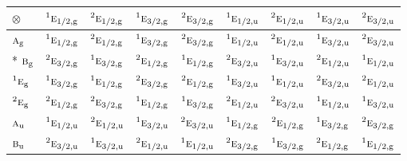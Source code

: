 \documentclass[10pt,a4paper]{article}
\numberwithin{equation}{section}
\newcommand{\irr}[1]{\text{\normalfont\scshape #1}}
\newcommand{\conjpair}[1]{{}^{#1}}
\newcommand{\ptag}[1]{\mathrm{#1}}
\newcommand{\irrprod}{\otimes}
\begin{document}
{\small\setlength{\tabcolsep}{3pt}\begin{longtable}{@{}lcccccccc@{}}\toprule
$\irrprod$ & $\conjpair{1}\irr{e}_{1/2,\ptag{g}}$ & $\conjpair{2}\irr{e}_{1/2,\ptag{g}}$ & $\conjpair{1}\irr{e}_{3/2,\ptag{g}}$ & $\conjpair{2}\irr{e}_{3/2,\ptag{g}}$ & $\conjpair{1}\irr{e}_{1/2,\ptag{u}}$ & $\conjpair{2}\irr{e}_{1/2,\ptag{u}}$ & $\conjpair{1}\irr{e}_{3/2,\ptag{u}}$ & $\conjpair{2}\irr{e}_{3/2,\ptag{u}}$\\\midrule\endhead
\bottomrule\endfoot\endlastfoot
$\irr{a}_{\ptag{g}}$ & $\conjpair{1}\irr{e}_{1/2,\ptag{g}}$ & $\conjpair{2}\irr{e}_{1/2,\ptag{g}}$ & $\conjpair{1}\irr{e}_{3/2,\ptag{g}}$ & $\conjpair{2}\irr{e}_{3/2,\ptag{g}}$ & $\conjpair{1}\irr{e}_{1/2,\ptag{u}}$ & $\conjpair{2}\irr{e}_{1/2,\ptag{u}}$ & $\conjpair{1}\irr{e}_{3/2,\ptag{u}}$ & $\conjpair{2}\irr{e}_{3/2,\ptag{u}}$\\*
$\irr{b}_{\ptag{g}}$ & $\conjpair{2}\irr{e}_{3/2,\ptag{g}}$ & $\conjpair{1}\irr{e}_{3/2,\ptag{g}}$ & $\conjpair{2}\irr{e}_{1/2,\ptag{g}}$ & $\conjpair{1}\irr{e}_{1/2,\ptag{g}}$ & $\conjpair{2}\irr{e}_{3/2,\ptag{u}}$ & $\conjpair{1}\irr{e}_{3/2,\ptag{u}}$ & $\conjpair{2}\irr{e}_{1/2,\ptag{u}}$ & $\conjpair{1}\irr{e}_{1/2,\ptag{u}}$\\
$\conjpair{1}\irr{e}_{\ptag{g}}$ & $\conjpair{1}\irr{e}_{3/2,\ptag{g}}$ & $\conjpair{1}\irr{e}_{1/2,\ptag{g}}$ & $\conjpair{2}\irr{e}_{3/2,\ptag{g}}$ & $\conjpair{2}\irr{e}_{1/2,\ptag{g}}$ & $\conjpair{1}\irr{e}_{3/2,\ptag{u}}$ & $\conjpair{1}\irr{e}_{1/2,\ptag{u}}$ & $\conjpair{2}\irr{e}_{3/2,\ptag{u}}$ & $\conjpair{2}\irr{e}_{1/2,\ptag{u}}$\\
$\conjpair{2}\irr{e}_{\ptag{g}}$ & $\conjpair{2}\irr{e}_{1/2,\ptag{g}}$ & $\conjpair{2}\irr{e}_{3/2,\ptag{g}}$ & $\conjpair{1}\irr{e}_{1/2,\ptag{g}}$ & $\conjpair{1}\irr{e}_{3/2,\ptag{g}}$ & $\conjpair{2}\irr{e}_{1/2,\ptag{u}}$ & $\conjpair{2}\irr{e}_{3/2,\ptag{u}}$ & $\conjpair{1}\irr{e}_{1/2,\ptag{u}}$ & $\conjpair{1}\irr{e}_{3/2,\ptag{u}}$\\
$\irr{a}_{\ptag{u}}$ & $\conjpair{1}\irr{e}_{1/2,\ptag{u}}$ & $\conjpair{2}\irr{e}_{1/2,\ptag{u}}$ & $\conjpair{1}\irr{e}_{3/2,\ptag{u}}$ & $\conjpair{2}\irr{e}_{3/2,\ptag{u}}$ & $\conjpair{1}\irr{e}_{1/2,\ptag{g}}$ & $\conjpair{2}\irr{e}_{1/2,\ptag{g}}$ & $\conjpair{1}\irr{e}_{3/2,\ptag{g}}$ & $\conjpair{2}\irr{e}_{3/2,\ptag{g}}$\\
$\irr{b}_{\ptag{u}}$ & $\conjpair{2}\irr{e}_{3/2,\ptag{u}}$ & $\conjpair{1}\irr{e}_{3/2,\ptag{u}}$ & $\conjpair{2}\irr{e}_{1/2,\ptag{u}}$ & $\conjpair{1}\irr{e}_{1/2,\ptag{u}}$ & $\conjpair{2}\irr{e}_{3/2,\ptag{g}}$ & $\conjpair{1}\irr{e}_{3/2,\ptag{g}}$ & $\conjpair{2}\irr{e}_{1/2,\ptag{g}}$ & $\conjpair{1}\irr{e}_{1/2,\ptag{g}}$\\

\end{longtable}}
\end{document}
